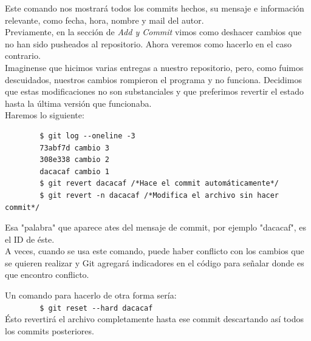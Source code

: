 \documentclass[a4paper, 12pt]{article}
\begin{document}
Este comando nos mostrará todos los commits hechos, su mensaje e información relevante, como fecha, hora, nombre y mail del autor.\\

Previamente, en la sección de \textit{Add y Commit} vimos como deshacer cambios que no han sido pusheados al repositorio. Ahora veremos como hacerlo en el caso contrario.\\

Imaginense que hicimos varias entregas a nuestro repositorio, pero, como fuimos descuidados, nuestros cambios rompieron el programa y no funciona. Decidimos que estas modificaciones no son substanciales y que preferimos revertir el estado hasta la última versión que funcionaba.\\
Haremos lo siguiente:

\begin{verbatim}
        $ git log --oneline -3
        73abf7d cambio 3
        308e338 cambio 2
        dacacaf cambio 1
        $ git revert dacacaf /*Hace el commit automáticamente*/
        $ git revert -n dacacaf /*Modifica el archivo sin hacer commit*/
\end{verbatim}

Esa "palabra" que aparece ates del mensaje de commit, por ejemplo "dacacaf", es el ID de éste.\\

A veces, cuando se usa este comando, puede haber conflicto con los cambios que se quieren realizar y Git agregará indicadores en el código para señalar donde es que encontro conflicto.

Un comando para hacerlo de otra forma sería:\\

\verb+        $ git reset --hard dacacaf+\\

Ésto revertirá el archivo completamente hasta ese commit descartando así todos los commits posteriores.
\end{document}

